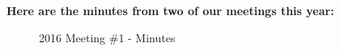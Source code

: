 \textbf{Here are the minutes from two of our meetings this year:}
\begin{figure}[H] 
	\caption{2016 Meeting \#1 - Minutes}
	\label{fig:speciation}
\end{figure}
